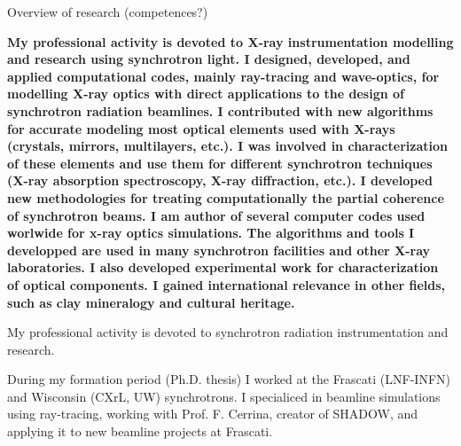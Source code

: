 


\prefix{}
\begin{rubric}{Overview of research (competences?)}

\entry*[]
    \textbf{My professional activity is devoted to X-ray instrumentation modelling and research using synchrotron light. I designed, developed, and applied computational codes, mainly ray-tracing and wave-optics, for modelling X-ray optics with direct applications to the design of synchrotron radiation beamlines.
    I contributed with new algorithms for accurate modeling most optical elements used with X-rays (crystals, mirrors, multilayers, etc.). I was involved in characterization of these elements and use them for different synchrotron techniques (X-ray absorption spectroscopy, X-ray diffraction, etc.). I developed new methodologies for treating computationally the partial coherence of synchrotron beams. I am author of several computer codes used worlwide for x-ray optics simulations. The algorithms and tools I developped are used in many synchrotron facilities and other X-ray laboratories. I also developed experimental work for characterization of optical components. I gained international relevance in other fields, such as clay mineralogy and cultural heritage.}


\entry*[Details]

My professional activity is devoted to synchrotron radiation
instrumentation and research.

During my formation period (Ph.D. thesis) I worked at the Frascati (LNF-INFN) and Wisconsin
(CXrL, UW) synchrotrons. I specialiced in beamline simulations using ray-tracing, working with Prof. F. Cerrina, creator of SHADOW, and applying it to new beamline projects at Frascati. 


\end{rubric}
